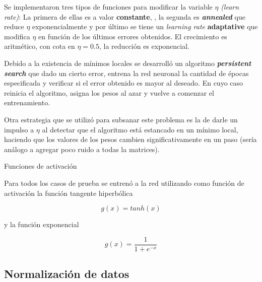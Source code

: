 \documentclass[%
    final,
    reprint,
    notitlepage,
    narroweqnarray,
    inline,
    twoside,
    invited
    ]{ieee}
\begin{document}
\par Se implementaron tres tipos de funciones para modificar la variable $\eta$ \textit{(learn rate)}: 
La primera de ellas es a valor \textbf{constante}, , la segunda es \textbf{\textit{annealed}} que reduce $\eta$ exponencialmente y por último se tiene un \textit{learning rate} \textbf{adaptative} que modifica $\eta$ en función de los últimos errores obtenidos. El crecimiento es aritmético, con cota en $\eta =0.5$, la reducción es exponencial.\\

\par Debido a la existencia de mínimos locales se desarrolló un algoritmo  \textbf{\textit{persistent search}} que dado un cierto error, entrena
 la red neuronal la cantidad de épocas especificada y verificar si el error obtenido es mayor al deseado. En cuyo caso reinicia el algoritmo, asigna los pesos al azar y vuelve a comenzar el entrenamiento.\\
\par Otra estrategia que se utilizó para subsanar este problema es la de darle un impulso a $\eta$ al detectar que el algoritmo está estancado 
en un mínimo local, haciendo que los valores de los pesos cambien significativamente en un paso (sería análogo a agregar poco ruido a todas la matrices).

\par{Funciones de activación}

\par Para todos los casos de prueba se entrenó a la red utilizando como función de activación la función tangente hiperbólica

\begin{equation}
g(x) = tanh(x)
\end{equation}


y la función exponencial

\begin{equation}
g(x) = \frac{1}{1+e^{-x}}
\end{equation}



\subsection{Normalización de datos}
\end{document}
